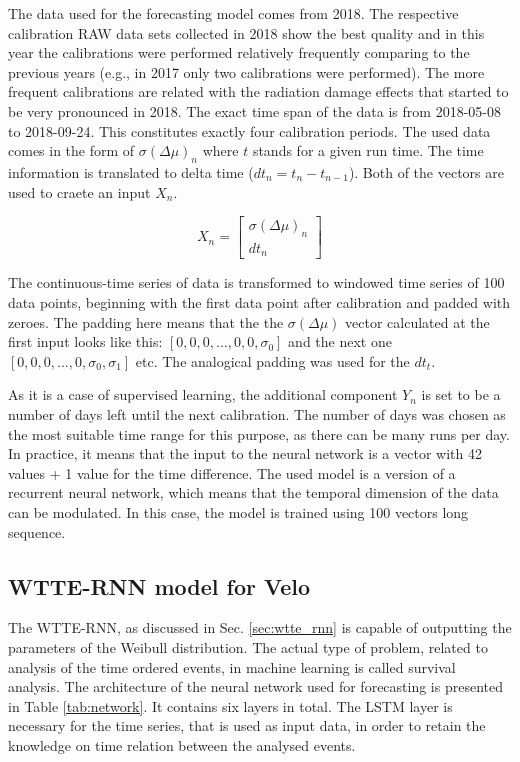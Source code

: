 The data used for the forecasting model comes from 2018. The respective calibration RAW data sets collected in 2018 show the best quality and in this year the calibrations were performed relatively frequently comparing to the previous years (e.g., in 2017 only two calibrations were performed). The more frequent calibrations are related with the radiation damage effects that started to be very pronounced in 2018. The exact time span of the data is from 2018-05-08 to 2018-09-24.
This constitutes exactly four calibration periods. The used data comes in the form of $\sigma(\Delta\mu)_{n}$ where $t$ stands for a given run time.
The time information is translated to delta time ($dt_{n} = t_{n}-t_{n-1}$). 
Both of the vectors are used to craete an input $X_{n}$.

\begin{equation}
X_{n} = \begin{bmatrix} \sigma(\Delta\mu)_{n} \\ dt_{n} \end{bmatrix}
\end{equation}

The continuous-time series of data is transformed to windowed time series of 100 data points, beginning with the first data point after calibration and padded with zeroes.
The padding here means that the the $\sigma(\Delta\mu)$ vector calculated at the first input looks like this: $[0, 0, 0, ..., 0, 0, \sigma_{0}]$ and the next one $[0, 0, 0, ..., 0, \sigma_{0}, \sigma_{1}]$ etc. The analogical padding was used for the $dt_{t}$.

As it is a case of supervised learning, the additional component $Y_{n}$ is set to be a number of days left until the next calibration.
The number of days was chosen as the most suitable time range for this purpose, as there can be many runs per day.
In practice, it means that the input to the neural network is a vector with 42 values + 1 value for the time difference.
The used model is a version of a recurrent neural network, which means that the temporal dimension of the data can be modulated.
In this case, the model is trained using 100 vectors long sequence.


\subsection{WTTE-RNN model for Velo}

The WTTE-RNN, as discussed in Sec. \ref{sec:wtte_rnn} is capable of outputting the parameters of the Weibull distribution.
The actual type of problem, related to analysis of the time ordered events, in machine learning is called survival analysis. The architecture of the neural network used for forecasting is presented in Table \ref{tab:network}.
It contains six layers in total. The LSTM layer is necessary for the time series, that is used as input data, in order to retain the knowledge on time relation between the analysed events.

